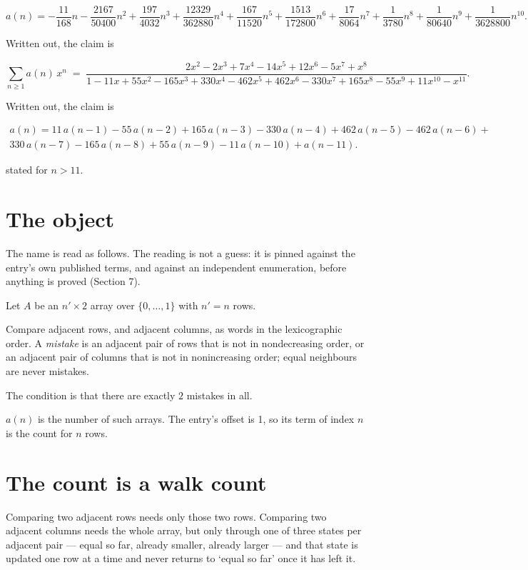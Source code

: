 \documentclass[11pt]{article}
\theoremstyle{definition}
\begin{document}
\[a(n) = -\frac{11}{168}n - \frac{2167}{50400}n^{2} + \frac{197}{4032}n^{3} + \frac{12329}{362880}n^{4} + \frac{167}{11520}n^{5} + \frac{1513}{172800}n^{6} + \frac{17}{8064}n^{7} + \frac{1}{3780}n^{8} + \frac{1}{80640}n^{9} + \frac{1}{3628800}n^{10}.\]

Written out, the claim is

\[\sum_{n \ge 1} a(n)\,x^n \;=\; \frac{2x^{2} - 2x^{3} + 7x^{4} - 14x^{5} + 12x^{6} - 5x^{7} + x^{8}}{1 - 11x + 55x^{2} - 165x^{3} + 330x^{4} - 462x^{5} + 462x^{6} - 330x^{7} + 165x^{8} - 55x^{9} + 11x^{10} - x^{11}}.\]

Written out, the claim is

\begin{multline*} a(n) = 11\,a(n-1) - 55\,a(n-2) + 165\,a(n-3) - 330\,a(n-4) + 462\,a(n-5) - 462\,a(n-6) + \\ 330\,a(n-7) - 165\,a(n-8) + 55\,a(n-9) - 11\,a(n-10) + a(n-11). \end{multline*}

stated for $n > 11$.

\section{The object}

The name is read as follows. The reading is not a guess: it is pinned against the entry's own published terms, and against an independent enumeration, before anything is proved (Section 7).

Let $A$ be an $n' \times 2$ array over $\{0,\dots,1\}$ with $n' = n$ rows.

Compare adjacent rows, and adjacent columns, as words in the lexicographic order. A {\itshape mistake} is an adjacent pair of rows that is not in nondecreasing order, or an adjacent pair of columns that is not in nonincreasing order; equal neighbours are never mistakes.

The condition is that there are exactly $2$ mistakes in all.

$a(n)$ is the number of such arrays. The entry's offset is 1, so its term of index $n$ is the count for $n$ rows.

\section{The count is a walk count}

Comparing two adjacent rows needs only those two rows. Comparing two adjacent columns needs the whole array, but only through one of three states per adjacent pair --- equal so far, already smaller, already larger --- and that state is updated one row at a time and never returns to `equal so far' once it has left it.
\end{document}
